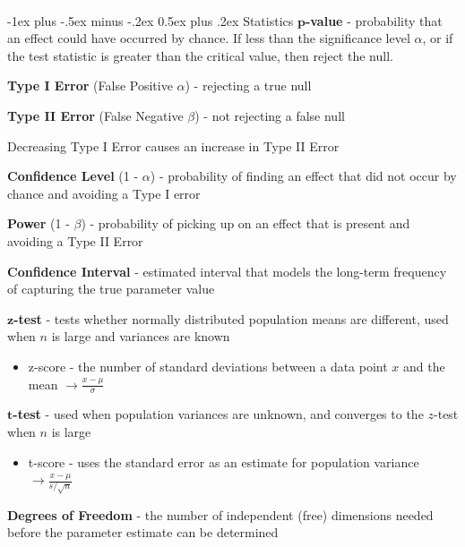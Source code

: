 \documentclass[10pt,landscape]{article}
\makeatletter
\renewcommand{\section}{\@startsection{section}{1}{0mm}%
                                {-1ex plus -.5ex minus -.2ex}%
                                {0.5ex plus .2ex}%
                                {\normalfont\large\bfseries}}
\makeatother
\begin{document}
\begin{multicols}{3}
        \columnbreak
        \textcolor{white}{.}\vspace{-5mm}\\ %
        \section{Statistics}
    $\boldsymbol p$\textbf{-value} - probability that an effect could have occurred by chance. If less than the significance level $\alpha$, or if the test statistic is greater than the critical value, then reject the null.

        \textbf{Type I Error} (False Positive $\alpha$) - rejecting a true null

        \textbf{Type II  Error} (False Negative $\beta$)  - not rejecting a false null

        Decreasing Type I Error causes an increase in Type II Error

        \textbf{Confidence Level} (1 - $\alpha$) - probability of finding an effect that did not occur by chance and avoiding a Type I error

        \textbf{Power} (1 - $\beta$) - probability of picking up on an effect that is present and avoiding a Type II Error

        \textbf{Confidence Interval} - estimated interval that models the long-term frequency of capturing the true parameter value

    $\boldsymbol{z}$\textbf{-test} - tests whether normally distributed population means are different, used when $n$ is large and variances are known
        \vspace{-.5mm}
        \begin{itemize}[label={--},leftmargin=4mm]
            \itemsep -.4mm
            \item z-score - the number of standard deviations between a data point $x$ and the mean $\to \frac{x - \mu}{\sigma}$
        \end{itemize}
        \vspace{-.5mm}
    $\boldsymbol{t}$\textbf{-test} - used when population variances are unknown, and converges to the $z$-test when $n$ is large
        \vspace{-.5mm}
        \begin{itemize}[label={--},leftmargin=4mm]
            \itemsep -.4mm
            \item t-score - uses the standard error as an estimate for population variance $\to \frac{x - \mu}{s/\sqrt{n}}$
        \end{itemize}
        \vspace{-1mm}
        \textbf{Degrees of Freedom} - the number of independent (free) dimensions needed before the parameter estimate can be determined


\end{multicols}
\end{document}
